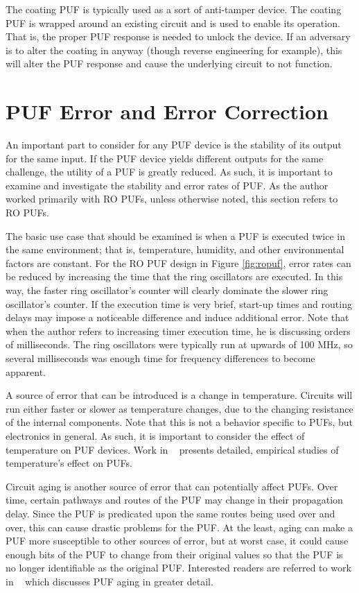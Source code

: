 The coating PUF is typically used as a sort of anti-tamper device. The coating PUF is wrapped
around an existing circuit and is used to enable its operation. That is, the proper PUF response
is needed to unlock the device. If an adversary is to alter the coating in anyway (though reverse engineering 
for example), this will alter the PUF response and cause the underlying circuit to not function. 

\section{PUF Error and Error Correction}
An important part to consider for any PUF device is the stability of its output for
the same input. If the PUF device yields different outputs for the same challenge, the
utility of a PUF is greatly reduced. As such, it is important to examine and investigate
the stability and error rates of PUF. As the author worked primarily with RO PUFs, unless
otherwise noted, this section refers to RO PUFs.

The basic use case that should be examined is when a PUF is executed twice in the same
environment; that is, temperature, humidity, and other environmental factors are constant.
For the RO PUF design in Figure \ref{fig:ropuf}, error rates can be reduced by increasing
the time that the ring oscillators are executed. In this way, the faster ring oscillator's
counter will clearly dominate the slower ring oscillator's counter. If the execution time
is very brief, start-up times and routing delays may impose a noticeable difference and
induce additional error. Note that when the author refers to increasing timer execution
time, he is discussing orders of milliseconds. The ring oscillators were typically run
at upwards of 100 MHz, so several milliseconds was enough time for frequency differences
to become apparent.

A source of error that can be introduced is a change in temperature. Circuits will run 
either faster or slower as temperature changes, due to the changing resistance of the
internal components. Note that this is not a behavior specific to PUFs, but electronics
in general. As such, it is important to consider the effect of temperature on PUF devices.
Work in ~\cite{puftemp} presents detailed, empirical studies of temperature's effect on
PUFs.


Circuit aging is another source of error that can potentially affect PUFs. Over time,
certain pathways and routes of the PUF may change in their propagation delay. Since the
PUF is predicated upon the same routes being used over and over, this can cause drastic
problems for the PUF. At the least, aging can make a PUF more susceptible to other
sources of error, but at worst case, it could cause enough bits of the PUF to change
from their original values so that the PUF is no longer identifiable as the original PUF.
Interested readers are referred to work in ~\cite{pufaging} 
which discusses PUF aging in greater detail.

